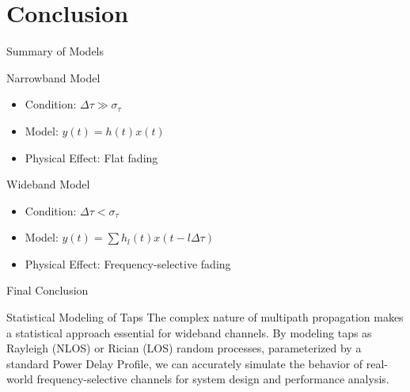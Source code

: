 \documentclass{beamer}
\begin{document}
	\section{Conclusion}
	
	\begin{frame}{Summary of Models}
		\begin{block}{Narrowband Model}
			\begin{itemize}
				\item Condition: $\Delta\tau \gg \sigma_\tau$
				\item Model: $y(t) = h(t)x(t)$
				\item Physical Effect: Flat fading
			\end{itemize}
		\end{block}
		
		\begin{block}{Wideband Model}
			\begin{itemize}
				\item Condition: $\Delta\tau < \sigma_\tau$
				\item Model: $y(t) = \sum h_l(t)x(t-l\Delta\tau)$
				\item Physical Effect: Frequency-selective fading
			\end{itemize}
		\end{block}
	\end{frame}
	
	\begin{frame}{Final Conclusion}
		\begin{alertblock}{Statistical Modeling of Taps}
			The complex nature of multipath propagation makes a statistical approach essential for wideband channels. By modeling taps as Rayleigh (NLOS) or Rician (LOS) random processes, parameterized by a standard Power Delay Profile, we can accurately simulate the behavior of real-world frequency-selective channels for system design and performance analysis.
		\end{alertblock}
	\end{frame}
	
\end{document}
